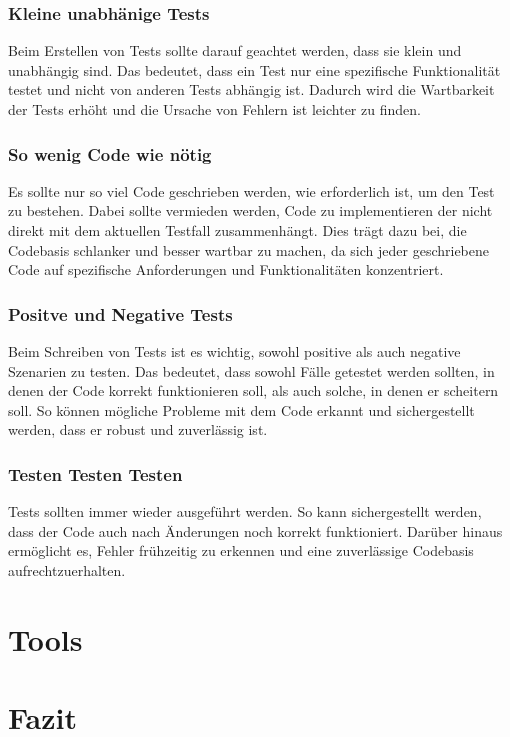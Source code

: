 \documentclass[a0,landscape]{a0poster}
\begin{document}
\begin{multicols}{4}
\subsubsection*{Kleine unabhänige Tests}
Beim Erstellen von Tests sollte darauf geachtet werden, dass sie klein und unabhängig sind. Das bedeutet, dass ein Test nur eine spezifische Funktionalität testet und nicht von anderen Tests abhängig ist. Dadurch wird die Wartbarkeit der Tests erhöht und die Ursache von Fehlern ist leichter zu finden.

\subsubsection*{So wenig Code wie nötig}
Es sollte nur so viel Code geschrieben werden, wie erforderlich ist, um den Test zu bestehen. Dabei sollte vermieden werden, Code zu implementieren der nicht direkt mit dem aktuellen Testfall zusammenhängt. Dies trägt dazu bei, die Codebasis schlanker und besser wartbar zu machen, da sich jeder geschriebene Code auf spezifische Anforderungen und Funktionalitäten konzentriert.

\subsubsection*{Positve und Negative Tests}
Beim Schreiben von Tests ist es wichtig, sowohl positive als auch negative Szenarien zu testen. Das bedeutet, dass sowohl Fälle getestet werden sollten, in denen der Code korrekt funktionieren soll, als auch solche, in denen er scheitern soll. So können mögliche Probleme mit dem Code erkannt und sichergestellt werden, dass er robust und zuverlässig ist.

\subsubsection*{Testen Testen Testen}
Tests sollten immer wieder ausgeführt werden. So kann sichergestellt werden, dass der Code auch nach Änderungen noch korrekt funktioniert. Darüber hinaus ermöglicht es, Fehler frühzeitig zu erkennen und eine zuverlässige Codebasis aufrechtzuerhalten.

\section*{Tools}

\color{SaddleBrown}
\section*{Fazit}


\color{DarkSlateGray}


\nocite{*} %



\end{multicols}
\end{document}
